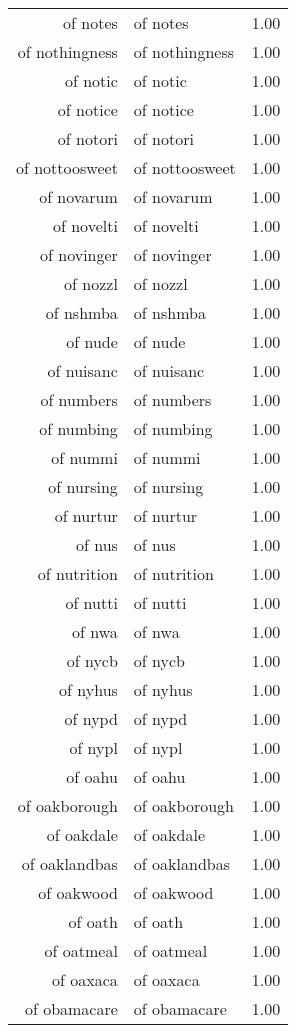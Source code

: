 \begin{table}[ht]
\begin{tabular}{rlr}
  of notes & of notes & 1.00 \\ 
  of nothingness & of nothingness & 1.00 \\ 
  of notic & of notic & 1.00 \\ 
  of notice & of notice & 1.00 \\ 
  of notori & of notori & 1.00 \\ 
  of nottoosweet & of nottoosweet & 1.00 \\ 
  of novarum & of novarum & 1.00 \\ 
  of novelti & of novelti & 1.00 \\ 
  of novinger & of novinger & 1.00 \\ 
  of nozzl & of nozzl & 1.00 \\ 
  of nshmba & of nshmba & 1.00 \\ 
  of nude & of nude & 1.00 \\ 
  of nuisanc & of nuisanc & 1.00 \\ 
  of numbers & of numbers & 1.00 \\ 
  of numbing & of numbing & 1.00 \\ 
  of nummi & of nummi & 1.00 \\ 
  of nursing & of nursing & 1.00 \\ 
  of nurtur & of nurtur & 1.00 \\ 
  of nus & of nus & 1.00 \\ 
  of nutrition & of nutrition & 1.00 \\ 
  of nutti & of nutti & 1.00 \\ 
  of nwa & of nwa & 1.00 \\ 
  of nycb & of nycb & 1.00 \\ 
  of nyhus & of nyhus & 1.00 \\ 
  of nypd & of nypd & 1.00 \\ 
  of nypl & of nypl & 1.00 \\ 
  of oahu & of oahu & 1.00 \\ 
  of oakborough & of oakborough & 1.00 \\ 
  of oakdale & of oakdale & 1.00 \\ 
  of oaklandbas & of oaklandbas & 1.00 \\ 
  of oakwood & of oakwood & 1.00 \\ 
  of oath & of oath & 1.00 \\ 
  of oatmeal & of oatmeal & 1.00 \\ 
  of oaxaca & of oaxaca & 1.00 \\ 
  of obamacare & of obamacare & 1.00 \\ 

\end{tabular}
\end{table}
